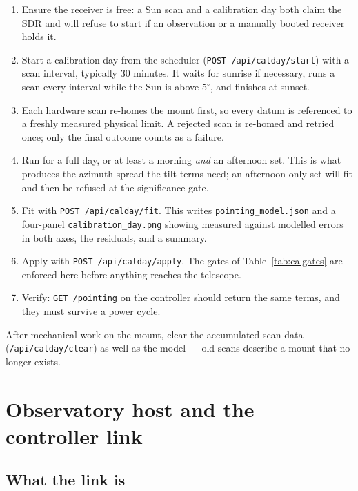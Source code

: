 \documentclass[11pt,a4paper]{article}
\begin{document}
\begin{enumerate}
    \item Ensure the receiver is free: a Sun scan and a calibration day both claim the SDR and will refuse to start if an observation or a manually booted receiver holds it.
    \item Start a calibration day from the scheduler (\texttt{POST /api/calday/start}) with a scan interval, typically 30 minutes. It waits for sunrise if necessary, runs a scan every interval while the Sun is above $5^\circ$, and finishes at sunset.
    \item Each hardware scan re-homes the mount first, so every datum is referenced to a freshly measured physical limit. A rejected scan is re-homed and retried once; only the final outcome counts as a failure.
    \item Run for a full day, or at least a morning \emph{and} an afternoon set. This is what produces the azimuth spread the tilt terms need; an afternoon-only set will fit and then be refused at the significance gate.
    \item Fit with \texttt{POST /api/calday/fit}. This writes \texttt{pointing\_model.json} and a four-panel \texttt{calibration\_day.png} showing measured against modelled errors in both axes, the residuals, and a summary.
    \item Apply with \texttt{POST /api/calday/apply}. The gates of Table~\ref{tab:calgates} are enforced here before anything reaches the telescope.
    \item Verify: \texttt{GET /pointing} on the controller should return the same terms, and they must survive a power cycle.
\end{enumerate}

After mechanical work on the mount, clear the accumulated scan data (\texttt{/api/calday/clear}) as well as the model --- old scans describe a mount that no longer exists.

\section{Observatory host and the controller link}
\label{sec:network}

\subsection{What the link is}
\end{document}
